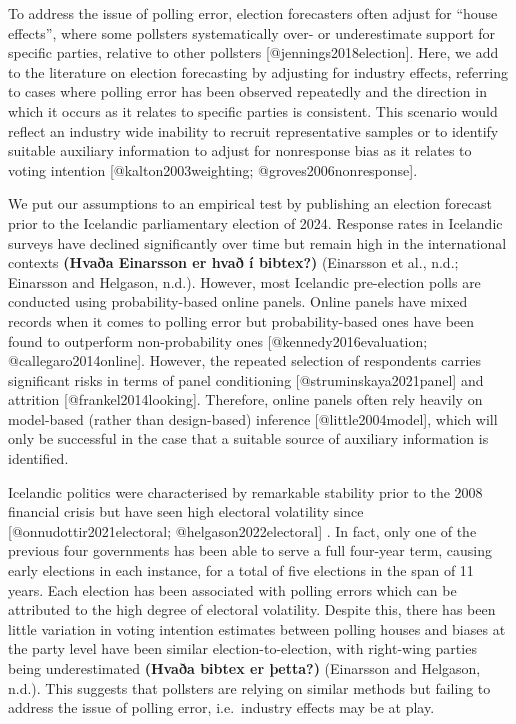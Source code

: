 \documentclass[
  letterpaper,
  DIV=11,
  numbers=noendperiod]{scrartcl}
\begin{document}
To address the issue of polling error, election forecasters often adjust
for ``house effects'', where some pollsters systematically over- or
underestimate support for specific parties, relative to other pollsters
{[}@jennings2018election{]}. Here, we add to the literature on election
forecasting by adjusting for industry effects, referring to cases where
polling error has been observed repeatedly and the direction in which it
occurs as it relates to specific parties is consistent. This scenario
would reflect an industry wide inability to recruit representative
samples or to identify suitable auxiliary information to adjust for
nonresponse bias as it relates to voting intention
{[}@kalton2003weighting; @groves2006nonresponse{]}.

We put our assumptions to an empirical test by publishing an election
forecast prior to the Icelandic parliamentary election of 2024. Response
rates in Icelandic surveys have declined significantly over time but
remain high in the international contexts \textbf{(Hvaða Einarsson er
hvað í bibtex?)} (Einarsson et al., n.d.; Einarsson and Helgason, n.d.).
However, most Icelandic pre-election polls are conducted using
probability-based online panels. Online panels have mixed records when
it comes to polling error but probability-based ones have been found to
outperform non-probability ones {[}@kennedy2016evaluation;
@callegaro2014online{]}. However, the repeated selection of respondents
carries significant risks in terms of panel conditioning
{[}@struminskaya2021panel{]} and attrition {[}@frankel2014looking{]}.
Therefore, online panels often rely heavily on model-based (rather than
design-based) inference {[}@little2004model{]}, which will only be
successful in the case that a suitable source of auxiliary information
is identified.

Icelandic politics were characterised by remarkable stability prior to
the 2008 financial crisis but have seen high electoral volatility since
{[}@onnudottir2021electoral; @helgason2022electoral{]} . In fact, only
one of the previous four governments has been able to serve a full
four-year term, causing early elections in each instance, for a total of
five elections in the span of 11 years. Each election has been
associated with polling errors which can be attributed to the high
degree of electoral volatility. Despite this, there has been little
variation in voting intention estimates between polling houses and
biases at the party level have been similar election-to-election, with
right-wing parties being underestimated \textbf{(Hvaða bibtex er
þetta?)} (Einarsson and Helgason, n.d.). This suggests that pollsters
are relying on similar methods but failing to address the issue of
polling error, i.e.~industry effects may be at play.
\end{document}
